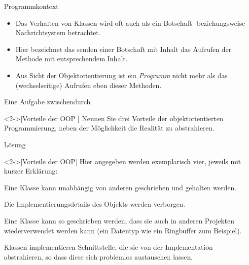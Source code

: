 \begin{frame}{Programmkontext}
    \begin{itemize}[<+(1)->]
        \widei
        \item Das Verhalten von Klassen wird oft auch als ein Botschaft- beziehungsweise Nachrichtsystem betrachtet.
        \item Hier bezeichnet das senden einer Botschaft mit Inhalt das Aufrufen der Methode mit entsprechendem Inhalt.
        \item Aus Sicht der Objektorientierung ist ein \emph{Programm}\pause{} nicht mehr als das (wechselseitige) Aufrufen eben dieser Methoden.
    \end{itemize}
\end{frame}

\ifull
\begin{frame}[c]{Eine Aufgabe zwischendurch}
    \begin{exercise}<2->[Vorteile der OOP ]
        Nennen Sie drei Vorteile der objektorientierten Programmierung, neben der Möglichkeit die Realität zu abstrahieren.
    \end{exercise}
\end{frame}

\begin{frame}[c]{Lösung}
    \begin{solve}<2->[Vorteile der OOP]
        Hier angegeben werden exemplarisch vier, jeweils mit kurzer Erklärung:
        \begin{description}[XYZ]
            \item[Modularität] Eine Klasse kann unabhängig von anderen geschrieben und gehalten werden.
            \item[Informationsverdeckung] Die Implementierungsdetails des Objekts werden verborgen.
            \item[Wiederverwendbarkeit] Eine Klasse kann so geschrieben werden, dass sie auch in anderen Projekten wiederverwendet werden kann\pause{} (ein Datentyp wie ein Ringbuffer zum Beispiel).
            \item[Komposition/Polymorphie] Klassen implementieren Schnittstelle, die sie von der Implementation abstrahieren,\pause{} so dass diese sich problemlos austauschen lassen.
        \end{description}
    \end{solve}
\end{frame}
\fi


